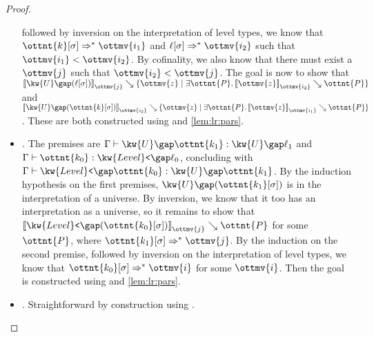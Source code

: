 \documentclass[a4paper,UKenglish,cleveref,autoref,thm-restate]{lipics-v2021}
\begin{document}
\begin{proof}
\begin{itemize}[topsep=0pt]
      followed by inversion on the interpretation of level types,
      we know that $  \ottnt{k} [  \sigma  ]   \Rightarrow^\ast   \ottmv{i_{{\mathrm{1}}}}  $ and $  \ell [  \sigma  ]   \Rightarrow^\ast   \ottmv{i_{{\mathrm{2}}}}  $ such that $ \ottmv{i_{{\mathrm{1}}}}  <  \ottmv{i_{{\mathrm{2}}}} $.
      By cofinality, we also know that there must exist a $\ottmv{j}$ such that $ \ottmv{i_{{\mathrm{2}}}}  <  \ottmv{j} $.
      The goal is now to show that $ \mathopen{\llbracket}   \kw{U} \gap   (  \ell [  \sigma  ]  )    \mathclose{\rrbracket}_{ \ottmv{j} } \searrow   \lbrace  \ottmv{z}  \mid   \exists  \ottnt{P}  \mathpunct{.}   \mathopen{\llbracket}  \ottmv{z}  \mathclose{\rrbracket}_{ \ottmv{i_{{\mathrm{2}}}} } \searrow  \ottnt{P}    \rbrace  $
      and $ \mathopen{\llbracket}   \kw{U} \gap   (  \ottnt{k} [  \sigma  ]  )    \mathclose{\rrbracket}_{ \ottmv{i_{{\mathrm{2}}}} } \searrow   \lbrace  \ottmv{z}  \mid   \exists  \ottnt{P}  \mathpunct{.}   \mathopen{\llbracket}  \ottmv{z}  \mathclose{\rrbracket}_{ \ottmv{i_{{\mathrm{1}}}} } \searrow  \ottnt{P}    \rbrace  $.
      These are both constructed using  and \cref{lem:lr:pars}.
    \item \textit{.}
      The premises are $ \Gamma  \vdash   \kw{U} \gap  \ottnt{k_{{\mathrm{1}}}}   \mathrel{:}   \kw{U} \gap  \ell_{{\mathrm{1}}}  $ and $ \Gamma  \vdash  \ottnt{k_{{\mathrm{0}}}}  \mathrel{:}   \kw{Level}\texttt{<} \gap  \ell_{{\mathrm{0}}}  $,
      concluding with $ \Gamma  \vdash   \kw{Level}\texttt{<} \gap  \ottnt{k_{{\mathrm{0}}}}   \mathrel{:}   \kw{U} \gap  \ottnt{k_{{\mathrm{1}}}}  $.
      By the induction hypothesis on the first premises,
      $ \kw{U} \gap   (  \ottnt{k_{{\mathrm{1}}}} [  \sigma  ]  )  $ is in the interpretation of a universe.
      By inversion, we know that it too has an interpretation as a universe,
      so it remains to show that $ \mathopen{\llbracket}   \kw{Level}\texttt{<} \gap   (  \ottnt{k_{{\mathrm{0}}}} [  \sigma  ]  )    \mathclose{\rrbracket}_{ \ottmv{j} } \searrow  \ottnt{P} $ for some $\ottnt{P}$,
      where $  \ottnt{k_{{\mathrm{1}}}} [  \sigma  ]   \Rightarrow^\ast   \ottmv{j}  $.
      By the induction on the second premise,
      followed by inversion on the interpretation of level types,
      we know that $  \ottnt{k_{{\mathrm{0}}}} [  \sigma  ]   \Rightarrow^\ast   \ottmv{i}  $ for some $\ottmv{i}$.
      Then the goal is constructed using  and \cref{lem:lr:pars}.
    \item \textit{.} Straightforward by construction using .

\end{itemize}
\end{proof}
\end{document}
